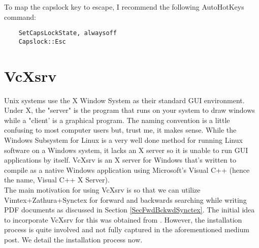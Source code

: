 To map the capslock key to escape, I recommend the following AutoHotKeys
command:
\begin{lstlisting}
    SetCapsLockState, alwaysoff
    Capslock::Esc
\end{lstlisting}

\section{VcXsrv}
Unix systems use the X Window System as their standard GUI environment.  Under
X, the "server" is the program that runs on your system to draw windows while a
"client' is a graphical program. The naming convention is a little confusing to
most computer users but, trust me, it makes sense.  While the Windows Subsystem
for Linux is a very well done method for running Linux software on a Windows
system, it lacks an X server so it is unable to run GUI applications by itself.
VcXsrv is an X server for Windows that's written to compile as a native Windows
application using Microsoft's Visual C++ (hence the name, Visual C++ X
Server).\\

The main motivation for using VcXsrv is so that we can utilize
Vimtex+Zathura+Synctex for forward and backwards searching while writing PDF
documents as discussed in Section \ref{SecFwdBckwdSynctex}. The initial idea to
incorporate VcXsrv for this was obtained from \cite{jong2020blazing}. However,
the installation process is quite involved and not fully captured in the
aforementioned medium post. We detail the installation process now.

